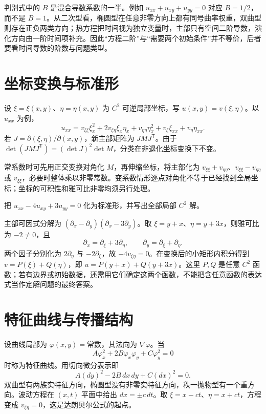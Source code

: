 \documentclass[UTF8,12pt,a4paper,fontset=fandol]{ctexbook}
\begin{document}
判别式中的 $B$ 是混合导数系数的一半。例如 $u_{xx}+u_{xy}+u_{yy}=0$ 对应 $B=1/2$，而不是 $B=1$。从二次型看，椭圆型在任意非零方向上都有同号曲率权重，双曲型则存在正负两类方向；热方程把时间视为独立变量时，主部只有空间二阶导数，演化方向由一阶时间项补充。因此“方程二阶”与“需要两个初始条件”并不等价，后者要看时间导数的阶数与问题类型。

\section{坐标变换与标准形}
设 $\xi=\xi(x,y)$、$\eta=\eta(x,y)$ 为 $C^2$ 可逆局部坐标，写 $u(x,y)=v(\xi,\eta)$。以 $u_{xx}$ 为例，
\[
 u_{xx}=v_{\xi\xi}\xi_x^2+2v_{\xi\eta}\xi_x\eta_x+v_{\eta\eta}\eta_x^2
         +v_\xi\xi_{xx}+v_\eta\eta_{xx}.
\]
若 $J=\partial(\xi,\eta)/\partial(x,y)$，新主部矩阵为 $JMJ^{\mathsf T}$。由于 $\det(JMJ^{\mathsf T})=(\det J)^2\det M$，分类在非退化坐标变换下不变。

常系数时可先用正交变换对角化 $M$，再伸缩坐标，将主部化为 $v_{\xi\xi}+v_{\eta\eta}$、$v_{\xi\xi}-v_{\eta\eta}$ 或 $v_{\xi\xi}$，必要时整体乘以非零常数。变系数情形逐点对角化不等于已经找到全局坐标；坐标的可积性和雅可比非零均须另行处理。

\begin{example}[直接用特征坐标消去平方项]
把 $u_{xx}-4u_{xy}+3u_{yy}=0$ 化为标准形，并写出全部局部 $C^2$ 解。
\end{example}
\begin{solve}
主部可因式分解为 $(\partial_x-\partial_y)(\partial_x-3\partial_y)$。取 $\xi=y+x$、$\eta=y+3x$，则雅可比为 $-2\ne0$，且
\[
 \partial_x=\partial_\xi+3\partial_\eta,\qquad
 \partial_y=\partial_\xi+\partial_\eta.
\]
两个因子分别化为 $2\partial_\eta$ 与 $-2\partial_\xi$，故 $-4v_{\xi\eta}=0$。在变换后的小矩形内积分得到 $v=P(\xi)+Q(\eta)$，即 $u=P(y+x)+Q(y+3x)$。这里 $P,Q$ 是任意 $C^2$ 函数；若有边界或初始数据，还需用它们确定这两个函数，不能把含任意函数的表达式当作定解问题的最终答案。
\end{solve}

\section{特征曲线与传播结构}
设曲线局部为 $\varphi(x,y)=\text{常数}$，其法向为 $\nabla\varphi$。当
\[
 A\varphi_x^2+2B\varphi_x\varphi_y+C\varphi_y^2=0
\]
时称为特征曲线。用切向微分表示即
\[
 A(dy)^2-2B\,dx\,dy+C(dx)^2=0.
\]
双曲型有两族实特征方向，椭圆型没有非零实特征方向，秩一抛物型有一个重方向。波动方程在 $(x,t)$ 平面中给出 $dx=\pm c\,dt$。取 $\xi=x-ct$、$\eta=x+ct$，方程变成 $v_{\xi\eta}=0$，这是达朗贝尔公式的起点。
\end{document}
